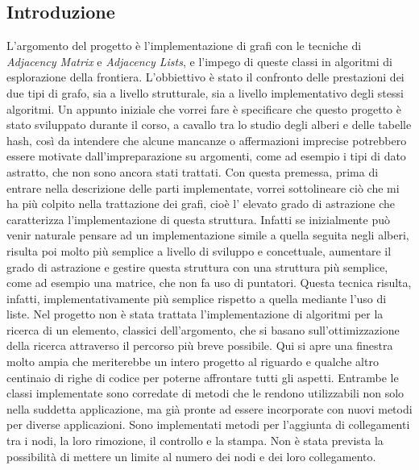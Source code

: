 \documentclass{article}
\begin{document}
\subsection{Introduzione}
L'argomento del progetto \`e l'implementazione di grafi con le tecniche di \textit{Adjacency Matrix} e \textit{Adjacency Lists}, e l'impego di queste classi in algoritmi di esplorazione della frontiera. \newline
L'obbiettivo \`e stato il confronto delle prestazioni dei due tipi di grafo, sia a livello strutturale, sia a livello implementativo degli stessi algoritmi. \newline
Un appunto iniziale che vorrei fare \`e specificare che questo progetto \`e stato sviluppato durante il corso, a cavallo tra lo studio degli alberi e delle tabelle hash, cos\`i da intendere che alcune mancanze o affermazioni imprecise potrebbero essere motivate dall'impreparazione su argomenti, come ad esempio i tipi di dato astratto, che non sono ancora stati trattati. \newline
Con questa premessa, prima di entrare nella descrizione delle parti implementate, vorrei sottolineare ci\`o che mi ha pi\`u colpito nella trattazione dei grafi, cio\`e l' elevato grado di astrazione che caratterizza l'implementazione di questa struttura. \newline
Infatti se inizialmente pu\`o venir naturale pensare ad un implementazione simile a quella seguita negli alberi, risulta poi molto pi\`u semplice a livello di sviluppo e concettuale, aumentare il grado di astrazione e gestire questa struttura con una struttura pi\`u semplice, come ad esempio una matrice, che non fa uso di puntatori. Questa tecnica risulta, infatti, implementativamente pi\`u semplice rispetto a quella mediante l'uso di liste. \newline
Nel progetto non \`e stata trattata l'implementazione di algoritmi per la ricerca di un elemento, classici dell'argomento, che si basano sull'ottimizzazione della ricerca attraverso il percorso pi\`u breve possibile. Qui si apre una finestra molto ampia che meriterebbe un intero progetto al riguardo e qualche altro centinaio di righe di codice per poterne affrontare tutti gli aspetti.\newline
Entrambe le classi implementate sono corredate di metodi che le rendono utilizzabili non solo nella suddetta applicazione, ma gi\`a pronte ad essere incorporate con nuovi metodi per diverse applicazioni. Sono implementati metodi per l'aggiunta di collegamenti tra i nodi, la loro rimozione, il controllo e la stampa. Non \`e stata prevista la possibilit\`a di mettere un limite al numero dei nodi e dei loro collegamento.
\end{document}
